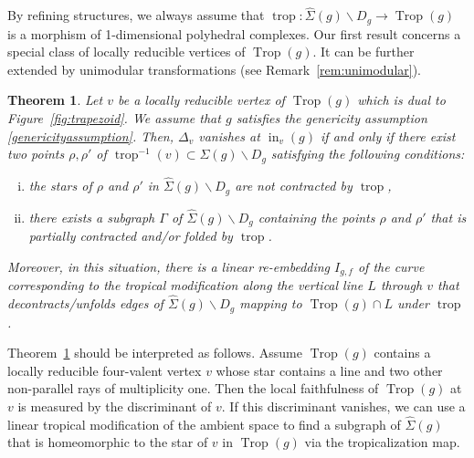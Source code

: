 \documentclass[11pt]{amsart}
\numberwithin{equation}{section}
\theoremstyle{plain}
\newtheorem{theorem}{Theorem}[section]
\theoremstyle{definition}
\theoremstyle{remark}
\begin{document}
By refining structures, we always assume
that $\operatorname{trop}\colon \widehat{\Sigma}(g)\smallsetminus D_g\to \operatorname{Trop}(g)$
is a morphism of 1-dimensional polyhedral complexes. Our first result concerns a special class of locally reducible
vertices of $\operatorname{Trop}(g)$. It can be further extended by unimodular
transformations (see Remark~\ref{rem:unimodular}). 
\begin{theorem}\label{thm:redVertex}
  Let $v$ be a locally reducible vertex of $\operatorname{Trop}(g)$ which is dual to
  Figure~\ref{fig:trapezoid}.  We assume that $g$ satisfies the
  genericity assumption \ref{genericityassumption}.  Then, $\Delta_v$
  vanishes at $\operatorname{in}_v(g)$ if and only if there exist two points
  $\rho, \rho'$ of $\operatorname{trop}^{-1}(v)\subset
  \widehat{\Sigma}(g)\smallsetminus D_g$ satisfying the following
  conditions:
  \begin{enumerate}[(i)]
  \item the stars of $\rho$ and $\rho'$ in
    $\widehat{\Sigma}(g)\smallsetminus D_g$ are not contracted by
    $\operatorname{trop}$,
  \item there exists a subgraph $\Gamma$ of
    $\widehat{\Sigma}(g)\smallsetminus D_g$ containing the points
    $\rho$ and $\rho'$ that is partially contracted and/or folded by
    $\operatorname{trop}$.
  \end{enumerate}

  Moreover, in this situation, there is a linear re-embedding
  $I_{g,f}$ of the curve corresponding to the tropical modification
  along the vertical line $L$ through $v$ that decontracts/unfolds
  edges of $\widehat{\Sigma} (g)\smallsetminus D_g $ mapping to
  $\operatorname{Trop}(g)\cap L$ under $\operatorname{trop}$.
\end{theorem}

Theorem~\ref{thm:redVertex} should be interpreted as follows. Assume
$\operatorname{Trop}(g)$ contains a locally reducible four-valent vertex $v$ whose
star contains a line and two other non-parallel rays of multiplicity
one. Then the local faithfulness of $\operatorname{Trop}(g)$ at $v$ is measured by
the discriminant of $v$. If this discriminant vanishes, we can use a
linear tropical modification of the ambient space to find a subgraph
of $\widehat{\Sigma}(g)$ that is homeomorphic to the star of $v$ in
$\operatorname{Trop}(g)$ via the tropicalization map.
\end{document}
